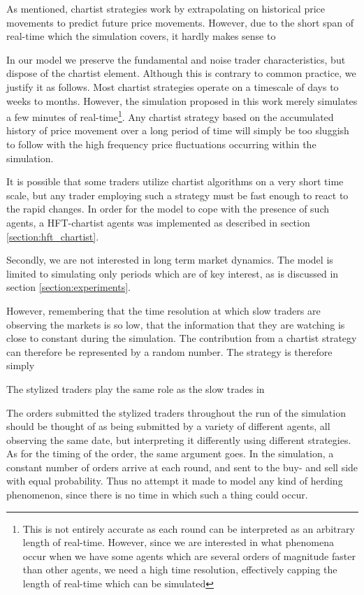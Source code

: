  
 
As mentioned, chartist strategies work by extrapolating on historical price movements to predict future price movements. However, due to the short span of real-time which the simulation covers, it hardly makes sense to 
 
In our model we preserve the fundamental and noise trader characteristics, but dispose of the chartist element. Although this is contrary to common practice, we justify it as follows. Most chartist strategies operate on a timescale of days to weeks to months. However, the simulation proposed in this work merely simulates a few minutes of real-time\footnote{This is not entirely accurate as each round can be interpreted as an arbitrary length of real-time. However, since we are interested in what phenomena occur when we have some agents which are several orders of magnitude faster than other agents, we need a high time resolution, effectively capping the length of real-time which can be simulated}. Any chartist strategy based on the accumulated history of price movement over a long period of time will simply be too sluggish to follow with the high frequency price fluctuations occurring within the simulation. 

It is possible that some traders utilize chartist algorithms on a very short time scale, but any trader employing such a strategy must be fast enough to react to the rapid changes. In order for the model to cope with the presence of such agents, a HFT-chartist agents was implemented as described in section \ref{section:hft_chartist}.



Secondly, we are not interested in long term market dynamics. The model is limited to simulating only periods which are of key interest, as is discussed in section \ref{section:experiments}.
 
 However, remembering that the time resolution at which slow traders are observing the markets is so low, that the information that they are watching is close to constant during the simulation. The contribution from a chartist strategy can therefore be represented by a random number. The strategy is therefore simply






The stylized traders play the same role as the slow trades in \cite{strategicLiquiditySupply}

The orders submitted the stylized traders throughout the run of the simulation should be thought of as being submitted by a variety of different agents, all observing the same date, but interpreting it differently using different strategies. As for the timing of the order, the same argument goes. In the simulation, a constant number of orders arrive at each round, and sent to the buy- and sell side with equal probability. Thus no attempt it made to model any kind of herding phenomenon, since there is no time in which such a thing could occur.


